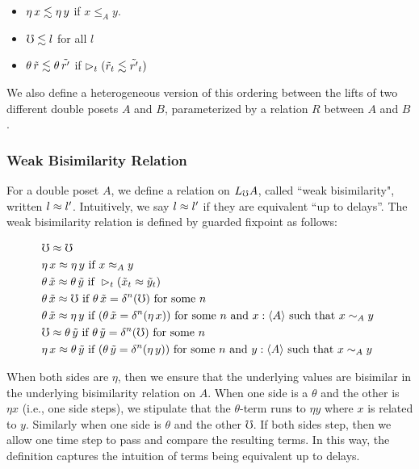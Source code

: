 \begin{itemize}
  \item 	$\eta\, x \lesssim \eta\, y$ if $x \le_A y$.
  \item 	$\mho \lesssim l$ for all $l$ 
  \item   $\theta\, \tilde{r} \lesssim \theta\, \tilde{r'}$ if
          $\vartriangleright_t (\tilde{r}_t \lesssim \tilde{r'}_t)$
\end{itemize}

We also define a heterogeneous version of this ordering between the lifts of two
different double posets $A$ and $B$, parameterized by a relation $R$ between $A$ and $B$.

\subsubsection{Weak Bisimilarity Relation}

For a double poset $A$, we define a relation on $L_\mho A$, called ``weak bisimilarity",
written $l \approx l'$. Intuitively, we say $l \approx l'$ if they are equivalent
``up to delays''.
%
The weak bisimilarity relation is defined by guarded fixpoint as follows:

\begin{align*}
  &\mho \bisim \mho \\
%
  &\eta\, x \bisim \eta\, y \text{ if } 
    x \bisim_A y \\
%		
  &\theta\, \tilde{x} \bisim \theta\, \tilde{y} \text{ if } 
    \later_t (\tilde{x}_t \bisim \tilde{y}_t) \\
%	
  &\theta\, \tilde{x} \bisim \mho \text{ if } 
    \theta\, \tilde{x} = \delta^n(\mho) \text { for some $n$ } \\
%	
  &\theta\, \tilde{x} \bisim \eta\, y \text{ if }
    (\theta\, \tilde{x} = \delta^n(\eta\, x))
  \text { for some $n$ and $x : \ty{A}$ such that $x \sim_A y$ } \\
%
  &\mho \bisim \theta\, \tilde{y} \text { if } 
    \theta\, \tilde{y} = \delta^n(\mho) \text { for some $n$ } \\
%	
  &\eta\, x \bisim \theta\, \tilde{y} \text { if }
    (\theta\, \tilde{y} = \delta^n (\eta\, y))
  \text { for some $n$ and $y : \ty{A}$ such that $x \sim_A y$ }
\end{align*}

When both sides are $\eta$, then we ensure that the underlying values are bisimilar
in the underlying bisimilarity relation on $A$.
When one side is a $\theta$ and the other is $\eta x$ (i.e., one side steps),
we stipulate that the $\theta$-term runs to $\eta y$ where $x$ is related to $y$.
Similarly when one side is $\theta$ and the other $\mho$.
If both sides step, then we allow one time step to pass and compare the resulting terms.
In this way, the definition captures the intuition of terms being equivalent up to
delays.

